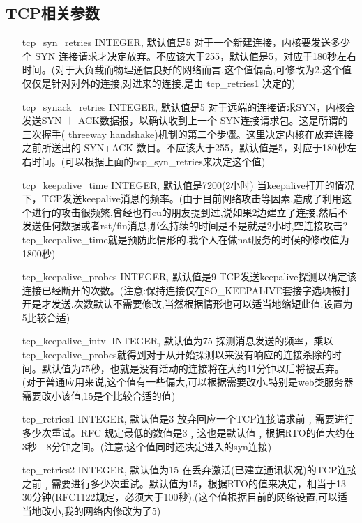     \subsection{TCP相关参数}
\begin{enumerate}
\item[tcp\_syn\_retries]  INTEGER,
默认值是5
对于一个新建连接，内核要发送多少个 SYN 连接请求才决定放弃。不应该大于255，默认值是5，对应于180秒左右时间。(对于大负载而物理通信良好的网络而言,这个值偏高,可修改为2.这个值仅仅是针对对外的连接,对进来的连接,是由
tcp\_retries1 决定的)

\item[tcp\_synack\_retries] INTEGER,
默认值是5
对于远端的连接请求SYN，内核会发送SYN ＋ ACK数据报，以确认收到上一个 SYN连接请求包。这是所谓的三次握手( threeway handshake)机制的第二个步骤。这里决定内核在放弃连接之前所送出的 SYN+ACK 数目。不应该大于255，默认值是5，对应于180秒左右时间。(可以根据上面的tcp\_syn\_retries来决定这个值)

\item[tcp\_keepalive\_time] INTEGER,
默认值是7200(2小时)
当keepalive打开的情况下，TCP发送keepalive消息的频率。(由于目前网络攻击等因素,造成了利用这个进行的攻击很频繁,曾经也有cu的朋友提到过,说如果2边建立了连接,然后不发送任何数据或者rst/fin消息,那么持续的时间是不是就是2小时,空连接攻击?tcp\_keepalive\_time就是预防此情形的.我个人在做nat服务的时候的修改值为1800秒)

\item[tcp\_keepalive\_probes] INTEGER,
默认值是9
TCP发送keepalive探测以确定该连接已经断开的次数。(注意:保持连接仅在SO\_KEEPALIVE套接字选项被打开是才发送.次数默认不需要修改,当然根据情形也可以适当地缩短此值.设置为5比较合适)

\item[tcp\_keepalive\_intvl] INTEGER,
默认值为75
探测消息发送的频率，乘以tcp\_keepalive\_probes就得到对于从开始探测以来没有响应的连接杀除的时间。默认值为75秒，也就是没有活动的连接将在大约11分钟以后将被丢弃。(对于普通应用来说,这个值有一些偏大,可以根据需要改小.特别是web类服务器需要改小该值,15是个比较合适的值)

\item[tcp\_retries1] INTEGER,
默认值是3
放弃回应一个TCP连接请求前﹐需要进行多少次重试。RFC 规定最低的数值是3﹐这也是默认值﹐根据RTO的值大约在3秒 - 8分钟之间。(注意:这个值同时还决定进入的syn连接)

\item[tcp\_retries2] INTEGER,
默认值为15
在丢弃激活(已建立通讯状况)的TCP连接之前﹐需要进行多少次重试。默认值为15，根据RTO的值来决定，相当于13-30分钟(RFC1122规定，必须大于100秒).(这个值根据目前的网络设置,可以适当地改小,我的网络内修改为了5)


\end{enumerate}
